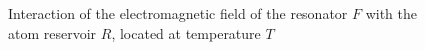 \begin{figure}
\centering



\caption{Interaction of the electromagnetic field of the resonator $F$ with
  the atom reservoir $R$, located at temperature $T$}
\label{figPart1Ch2_7}
\end{figure}